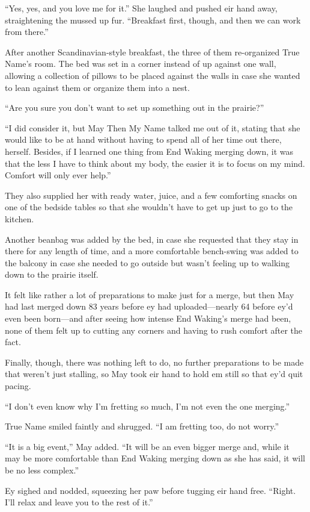 ``Yes, yes, and you love me for it.'' She laughed and pushed eir hand away, straightening the mussed up fur. ``Breakfast first, though, and then we can work from there.''

After another Scandinavian-style breakfast, the three of them re-organized True Name's room. The bed was set in a corner instead of up against one wall, allowing a collection of pillows to be placed against the walls in case she wanted to lean against them or organize them into a nest.

``Are you sure you don't want to set up something out in the prairie?''

``I did consider it, but May Then My Name talked me out of it, stating that she would like to be at hand without having to spend all of her time out there, herself. Besides, if I learned one thing from End Waking merging down, it was that the less I have to think about my body, the easier it is to focus on my mind. Comfort will only ever help.''

They also supplied her with ready water, juice, and a few comforting snacks on one of the bedside tables so that she wouldn't have to get up just to go to the kitchen.

Another beanbag was added by the bed, in case she requested that they stay in there for any length of time, and a more comfortable bench-swing was added to the balcony in case she needed to go outside but wasn't feeling up to walking down to the prairie itself.

It felt like rather a lot of preparations to make just for a merge, but then May had last merged down 83 years before ey had uploaded—nearly 64 before ey'd even been born—and after seeing how intense End Waking's merge had been, none of them felt up to cutting any corners and having to rush comfort after the fact.

Finally, though, there was nothing left to do, no further preparations to be made that weren't just stalling, so May took eir hand to hold em still so that ey'd quit pacing.

``I don't even know why I'm fretting so much, I'm not even the one merging.''

True Name smiled faintly and shrugged. ``I am fretting too, do not worry.''

``It is a big event,'' May added. ``It will be an even bigger merge and, while it may be more comfortable than End Waking merging down as she has said, it will be no less complex.''

Ey sighed and nodded, squeezing her paw before tugging eir hand free. ``Right. I'll relax and leave you to the rest of it.''

